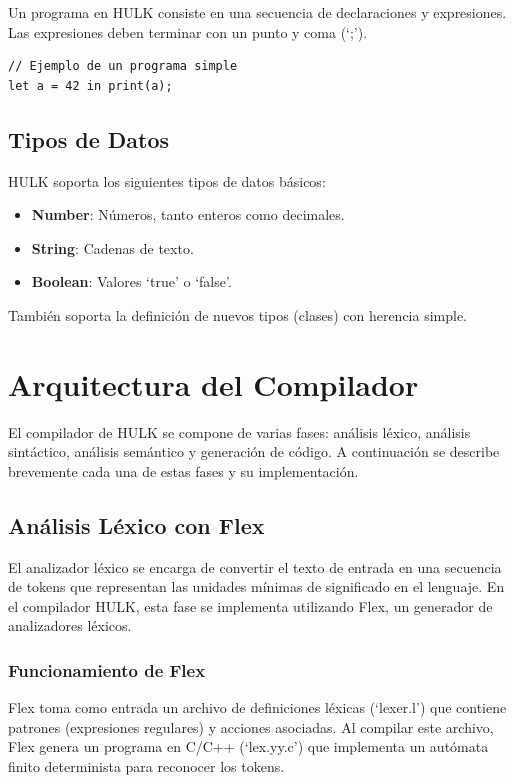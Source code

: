 \documentclass{article}
\begin{document}
Un programa en HULK consiste en una secuencia de declaraciones y expresiones. Las expresiones deben terminar con un punto y coma (`;').

\begin{verbatim}
// Ejemplo de un programa simple
let a = 42 in print(a);
\end{verbatim}

\subsection{Tipos de Datos}

HULK soporta los siguientes tipos de datos básicos:
\begin{itemize}
    \item \textbf{Number}: Números, tanto enteros como decimales.
    \item \textbf{String}: Cadenas de texto.
    \item \textbf{Boolean}: Valores `true' o `false'.
\end{itemize}

También soporta la definición de nuevos tipos (clases) con herencia simple.

\section{Arquitectura del Compilador}

El compilador de HULK se compone de varias fases: análisis léxico, análisis sintáctico, análisis semántico y generación de código. A continuación se describe brevemente cada una de estas fases y su implementación.

\subsection{Análisis Léxico con Flex}

El analizador léxico se encarga de convertir el texto de entrada en una secuencia de tokens que representan las unidades mínimas de significado en el lenguaje. En el compilador HULK, esta fase se implementa utilizando Flex, un generador de analizadores léxicos.

\subsubsection{Funcionamiento de Flex}

Flex toma como entrada un archivo de definiciones léxicas (`lexer.l') que contiene patrones (expresiones regulares) y acciones asociadas. Al compilar este archivo, Flex genera un programa en C/C++ (`lex.yy.c') que implementa un autómata finito determinista para reconocer los tokens.
\end{document}
